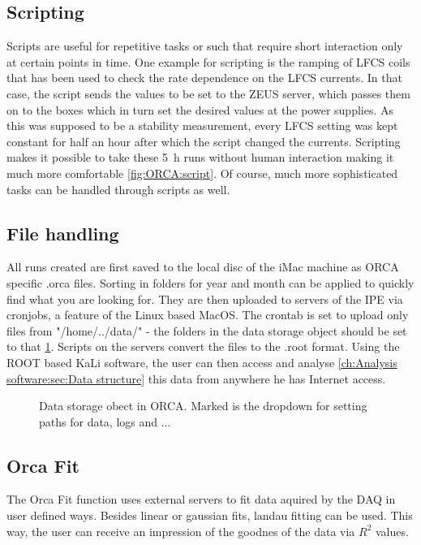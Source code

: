     \subsection{Scripting}
    \label{ch:OrcaControl:sec:Scripting}
    Scripts are useful for repetitive tasks or such that require short interaction only at certain points in time. One example for scripting is the ramping of LFCS coils that has been used to check the rate dependence on the LFCS currents. In that case, the script sends the values to be set to the ZEUS server, which passes them on to the  boxes which in turn set the desired values at the power supplies. As this was supposed to be a stability measurement, every LFCS setting was kept constant for half an hour after which the script changed the currents. Scripting makes it possible to take these \SI{5}{\hour} runs without human interaction making it much more comfortable \ref{fig:ORCA:script}. Of course, much more sophisticated tasks can be handled through scripts as well.
    
    \subsection{File handling}
    \label{ch:OrcaControl:sec:FileHandling}
    All runs created are first saved to the local disc of the iMac machine as ORCA specific .orca files. Sorting in folders for year and month can be applied to quickly find what you are looking for. They are then uploaded to servers of the IPE via cronjobs, a feature of the Linux based MacOS. The crontab is set to upload only files from "/home/../data/"  - the folders in the data storage object should be set to that \ref{fig:ORCA:dataStorage}. Scripts on the servers convert the files to the .root format. Using the ROOT based KaLi software, the user can then access and analyse \ref{ch:Analysis software:sec:Data structure} this data from anywhere he has Internet access. 
    
    \begin{figure}
    	\caption[ORCA data object]{Data storage obect in ORCA. Marked is the dropdown for setting paths for data, logs and ...}
    	\label{fig:ORCA:dataStorage}
    \end{figure}

    
    \subsection{Orca Fit}
    \label{ch:OrcaControl:sec:OrcaFit}
    The Orca Fit function uses external servers to fit data aquired by the DAQ in user defined ways. Besides linear or gaussian fits, landau fitting can be used. This way, the user can receive an impression of the goodnes of the data via $R^2$ values.
  
